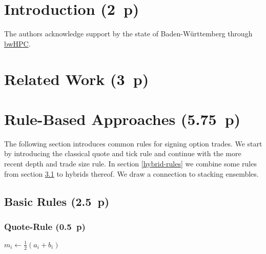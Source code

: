 \section{Introduction (2~p)}\label{introduction}

The authors acknowledge support by the state of Baden-Württemberg through \href{https://www.bwhpc.de/}{bwHPC}.

\section{Related Work (3~p)}\label{related-work}

\newpage
\section{Rule-Based Approaches (5.75~p)}\label{rule-based-approaches}


The following section introduces common rules for signing option trades. We start by introducing the classical quote and tick rule and continue with the more recent depth and trade size rule. In section \ref{hybrid-rules} we combine some rules from section \ref{basic-rules} to hybrids thereof. We draw a connection to stacking ensembles.

\subsection{Basic Rules (2.5~p)}\label{basic-rules}

\subsubsection{Quote-Rule (0.5~p)}\label{quote-rule}

\begin{algorithm}


  \caption{$\operatorname{\mathtt{quote}}$ \label{alg:quote-rule}}


  \BlankLine %

  $m_i \leftarrow \frac{1}{2}(a_i + b_i)$ 

  \uElse{%
    \Return
  }
\end{algorithm}




